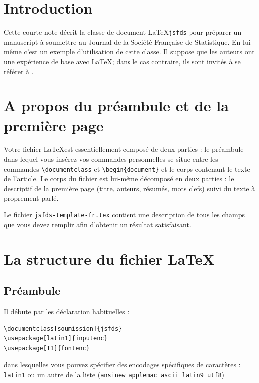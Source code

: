 \documentclass[soumission]{jsfds}
\begin{document}
\begin{frontmatter}
  \begin{motscles}
  \end{motscles}

  \begin{motsclesalter}
  \end{motsclesalter}
  
  \begin{AMSclass}
  \end{AMSclass}
 
\end{frontmatter}

\section{Introduction}
Cette courte note décrit la classe de document \LaTeX \texttt{jsfds} pour préparer un manuscript à soumettre au Journal de la Société Française de Statistique. En lui-même c'est un exemple d'utilisation de cette classe. Il suppose que les auteurs ont une expérience de base avec \LaTeX ; dans le cas contraire, ils sont invités à se référer à \cite{lam94}.

\section{A propos du préambule et de la première page}
Votre fichier \LaTeX est essentiellement composé de deux parties : le préambule dans lequel vous insérez vos commandes personnelles se situe entre les commandes \verb+\documentclass+ et \verb+\begin{document}+ et le corps contenant le texte de l'article. Le corps du fichier est lui-même décomposé en deux parties : le descriptif de la première page (titre, auteurs, résumés, mots clefs) suivi du texte à proprement parlé. 

Le fichier \verb+jsfds-template-fr.tex+ contient une description de tous les champs que vous devez remplir afin d'obtenir un résultat satisfaisant.

\section{La structure du fichier \LaTeX}
\subsection{Préambule}
Il débute par les déclaration habituelles :
\begin{verbatim}
\documentclass[soumission]{jsfds}
\usepackage[latin1]{inputenc}
\usepackage[T1]{fontenc}
\end{verbatim}
dans lesquelles vous pouvez spécifier des encodages spécifiques de caractères : \verb+latin1+ ou un autre de la liste (\verb+ansinew applemac ascii latin9 utf8+)
\end{document}
